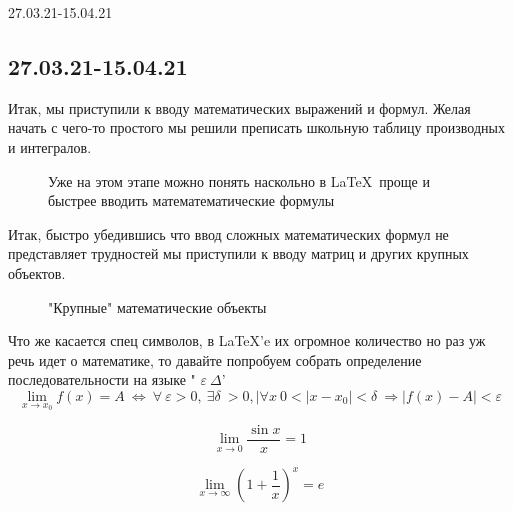\documentclass{beamer}
\begin{document}
\begin{frame}{27.03.21-15.04.21}
\subsection{27.03.21-15.04.21}
Итак, мы приступили к вводу математических выражений и формул. Желая начать с чего-то простого мы решили преписать школьную таблицу производных и интегралов.
\begin{figure}[h!]
\setlength{\fboxsep}{0pt}%
\setlength{\fboxrule}{1pt}%
%
\caption{Уже на этом этапе можно понять наскольно в \LaTeX \  проще и быстрее вводить математематические формулы}
\label{fig:image}
\end{figure}
\end{frame}

\begin{frame}

Итак, быстро убедившись что ввод сложных математических формул не представляет трудностей мы приступили к вводу матриц и других крупных объектов.
\begin{figure}[h!]
\setlength{\fboxsep}{0pt}%
\setlength{\fboxrule}{1pt}%
%
\caption{"Крупные" математические объекты}
\end{figure}

\end{frame}

\begin{frame}

Что же касается спец символов, в \LaTeX 'e их огромное количество но раз уж речь идет о математике, то давайте попробуем собрать определение последовательности на языке " $\varepsilon \ \Delta $'
$$\lim_{x \rightarrow x_0}f(x) = A \  \Leftrightarrow \   \forall \ \varepsilon > 0, \ \exists \delta \ >0, |\forall x \ 0<|x-x_0|<\delta \ \Rightarrow |f(x) - A|< \varepsilon   $$


$$\lim_{x \rightarrow 0}\frac{\sin x}{x} = 1  $$

$$\lim_{x \rightarrow \infty} \left( 1 + \frac{1}{x} \right)^x = e  $$


\end{frame}
\end{document}
